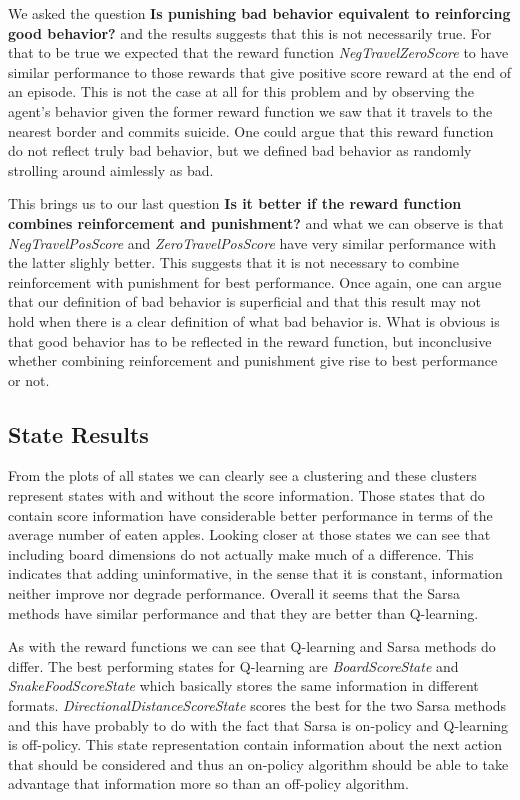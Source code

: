 \documentclass[result.tex]{subfiles}
\begin{document}
    We asked the question \textbf{Is punishing bad behavior equivalent to reinforcing good behavior?} and the results suggests that this is not necessarily true. For that to be true we expected that the reward function \textit{NegTravelZeroScore} to have similar performance to those rewards that give positive score reward at the end of an episode. This is not the case at all for this problem and by observing the agent's behavior given the former reward function we saw that it travels to the nearest border and commits suicide. One could argue that this reward function do not reflect truly bad behavior, but we defined bad behavior as randomly strolling around aimlessly as bad.

    This brings us to our last question \textbf{Is it better if the reward function combines reinforcement and punishment?} and what we can observe is that \textit{NegTravelPosScore} and \textit{ZeroTravelPosScore} have very similar performance with the latter slighly better. This suggests that it is not necessary to combine reinforcement with punishment for best performance. Once again, one can argue that our definition of bad behavior is superficial and that this result may not hold when there is a clear definition of what bad behavior is. What is obvious is that good behavior has to be reflected in the reward function, but inconclusive whether combining reinforcement and punishment give rise to best performance or not.

    \subsection*{State Results}

    From the plots of all states we can clearly see a clustering and these clusters represent states with and without the score information. Those states that do contain score information have considerable better performance in terms of the average number of eaten apples. Looking closer at those states we can see that including board dimensions do not actually make much of a difference. This indicates that adding uninformative, in the sense that it is constant, information neither improve nor degrade performance. Overall it seems that the Sarsa methods have similar performance and that they are better than Q-learning.

    As with the reward functions we can see that Q-learning and Sarsa methods do differ. The best performing states for Q-learning are \textit{BoardScoreState} and \textit{SnakeFoodScoreState} which basically stores the same information in different formats. \textit{DirectionalDistanceScoreState} scores the best for the two Sarsa methods and this have probably to do with the fact that Sarsa is on-policy and Q-learning is off-policy. This state representation contain information about the next action that should be considered and thus an on-policy algorithm should be able to take advantage that information more so than an off-policy algorithm.
\end{document}
